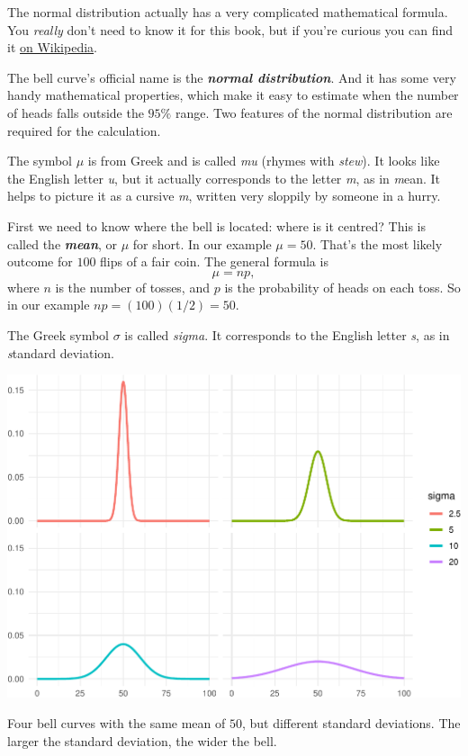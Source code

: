 \documentclass[justified]{tufte-book}
\theoremstyle{definition}
\theoremstyle{definition}
\theoremstyle{definition}
\theoremstyle{remark}
\begin{document}
\begin{marginfigure}
The normal distribution actually has a very complicated mathematical
formula. You \emph{really} don't need to know it for this book, but if
you're curious you can find it
\href{https://en.wikipedia.org/wiki/Normal_distribution}{on Wikipedia}.
\end{marginfigure}

The bell curve's official name is the \textbf{\emph{normal
distribution}}. And it has some very handy mathematical properties,
which make it easy to estimate when the number of heads falls outside
the \(95\%\) range. Two features of the normal distribution are required
for the calculation.

\begin{marginfigure}
The symbol \(\mu\) is from Greek and is called \emph{mu} (rhymes with
\emph{stew}). It looks like the English letter \emph{u}, but it actually
corresponds to the letter \emph{m}, as in \emph{m}ean. It helps to
picture it as a cursive \emph{m}, written very sloppily by someone in a
hurry.
\end{marginfigure}

First we need to know where the bell is located: where is it centred?
This is called the \textbf{\emph{mean}}, or \(\mu\) for short. In our
example \(\mu = 50\). That's the most likely outcome for \(100\) flips
of a fair coin. The general formula is \[ \mu = np, \] where \(n\) is
the number of tosses, and \(p\) is the probability of heads on each
toss. So in our example \(np = (100)(1/2) = 50\).

\begin{marginfigure}
The Greek symbol \(\sigma\) is called \emph{sigma}. It corresponds to
the English letter \emph{s}, as in \emph{s}tandard deviation.
\end{marginfigure}

\begin{marginfigure}
\includegraphics{_main_files/figure-latex/normalsds-1} \caption[Four bell curves with the same mean of $50$, but different standard deviations]{Four bell curves with the same mean of $50$, but different standard deviations. The larger the standard deviation, the wider the bell.}\label{fig:normalsds}
\end{marginfigure}
\end{document}
